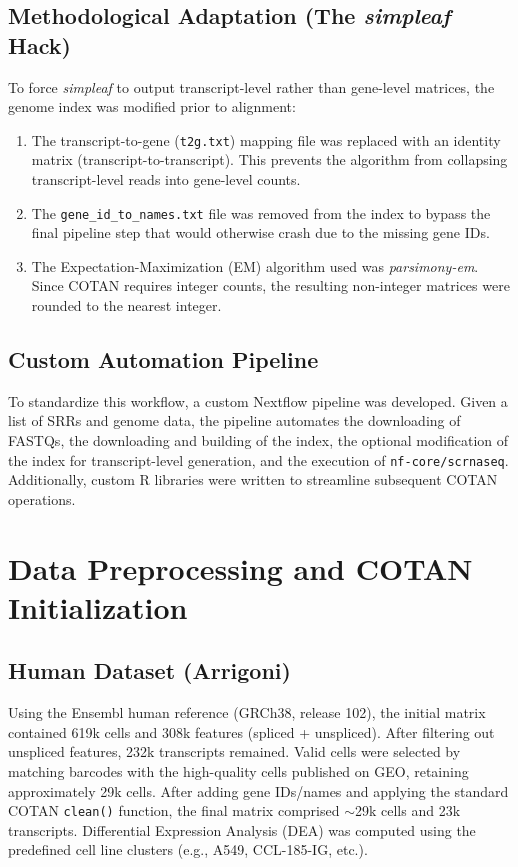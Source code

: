 \subsection{Methodological Adaptation (The \textit{simpleaf} Hack)}
To force \textit{simpleaf} to output transcript-level rather than gene-level matrices, the genome index was modified prior to alignment:
\begin{enumerate}
    \item The transcript-to-gene (\texttt{t2g.txt}) mapping file was replaced with an identity matrix (transcript-to-transcript). This prevents the algorithm from collapsing transcript-level reads into gene-level counts.
    \item The \texttt{gene\_id\_to\_names.txt} file was removed from the index to bypass the final pipeline step that would otherwise crash due to the missing gene IDs.
    \item The Expectation-Maximization (EM) algorithm used was \textit{parsimony-em}. Since COTAN requires integer counts, the resulting non-integer matrices were rounded to the nearest integer.
\end{enumerate}

\subsection{Custom Automation Pipeline}
To standardize this workflow, a custom Nextflow pipeline was developed. Given a list of SRRs and genome data, the pipeline automates the downloading of FASTQs, the downloading and building of the index, the optional modification of the index for transcript-level generation, and the execution of \texttt{nf-core/scrnaseq}. Additionally, custom R libraries were written to streamline subsequent COTAN operations.

\section{Data Preprocessing and COTAN Initialization}

\subsection{Human Dataset (Arrigoni)}
Using the Ensembl human reference (GRCh38, release 102), the initial matrix contained 619k cells and 308k features (spliced + unspliced). After filtering out unspliced features, 232k transcripts remained. Valid cells were selected by matching barcodes with the high-quality cells published on GEO, retaining approximately 29k cells. After adding gene IDs/names and applying the standard COTAN \texttt{clean()} function, the final matrix comprised $\sim$29k cells and 23k transcripts. Differential Expression Analysis (DEA) was computed using the predefined cell line clusters (e.g., A549, CCL-185-IG, etc.).

